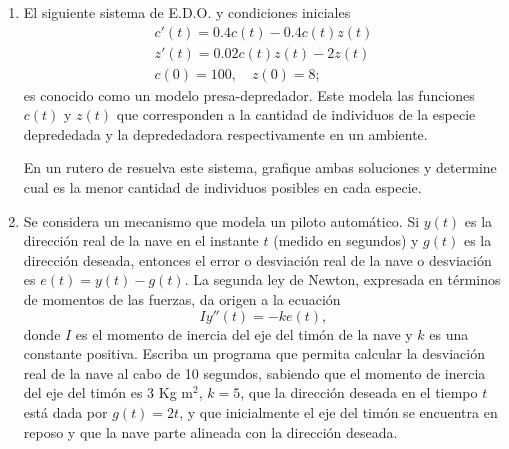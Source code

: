 \documentclass[letter,11pt]{article}
\begin{document}
\begin{enumerate}
\item El siguiente sistema de E.D.O. y condiciones iniciales
$$
\begin{array}{c}
c'(t) = 0.4c(t)-0.4c(t)z(t)\\
z'(t)=0.02c(t)z(t)-2z(t)\\
c(0)=100,\quad z(0)=8;
\end{array}
$$
es conocido como un modelo presa-depredador. Este modela las funciones $c(t)$ y $z(t)$ que corresponden a la cantidad de individuos de la especie deprededada y la deprededadora respectivamente en un ambiente.

En un rutero de \octave resuelva este sistema, grafique ambas soluciones y determine cual es la menor cantidad de individuos posibles en cada especie.

\item Se considera un mecanismo que modela un piloto autom\'atico. Si $y(t)$ es la direcci\'on real de la nave en el instante $t$ (medido en segundos) y $g(t)$ es la direcci\'on deseada, entonces el error o desviaci\'on real de la nave o desviaci\'on es $e(t)=y(t)-g(t)$. La segunda ley de Newton, expresada en t\'erminos de momentos de las fuerzas, da origen a la ecuaci\'on 
$$ I y''(t) = -k e(t), $$
donde $I$ es el momento de inercia del eje del tim\'on de la nave y $k$ es una constante positiva. Escriba un programa \octave que permita calcular la desviaci\'on real de la nave al cabo de 10 segundos, sabiendo que el momento de inercia del eje del tim\'on es 3 Kg m$^2$, $k=5$, que la direcci\'on deseada en el tiempo $t$ est\'a dada por $g(t)=2t$, y que inicialmente el eje del tim\'on se encuentra en reposo y que la nave parte alineada con la direcci\'on deseada.
\end{enumerate}
\end{document}
